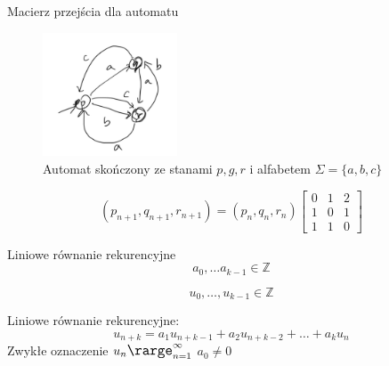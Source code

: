 \documentclass[handout]{beamer}
\theoremstyle{definition}
\begin{document}
\begin{frame}{Macierz przejścia dla automatu}
\begin{figure}
    \centering
    \includegraphics[width=40mm]{img/Zaznaczenie_079.png}
    \caption{Automat skończony ze stanami $p, g, r$ i alfabetem $\Sigma = \{a,b,c \}$}
    \label{fig:my_label}
\end{figure}
    $$
    (p_{n+1}, q_{n+1}, r_{n+1}) 
    = (p_{n},q_{n},r_{n}) \begin{bmatrix}
    0 & 1 & 2 \\
    1 & 0 & 1 \\
    1 & 1 & 0
    \end{bmatrix}
    $$
\end{frame}

\begin{frame}{Liniowe równanie rekurencyjne}
    $$
        a_0, \ldots a_{k-1} \in \mathbb{Z} 
    $$

    $$
        u_0, \ldots, u_{k-1} \in \mathbb{Z}
    $$


    Liniowe równanie rekurencyjne: 
    $$
    u_{n+k}=a_{1} u_{n+k-1}+a_{2} u_{n+k-2}+\ldots+a_{k} u_{n}
    $$
    Zwykłe oznaczenie $\large u_n \rarge _{n=1}^{\infty}$
    $a_0 \neq 0$
\end{frame}
\end{document}
